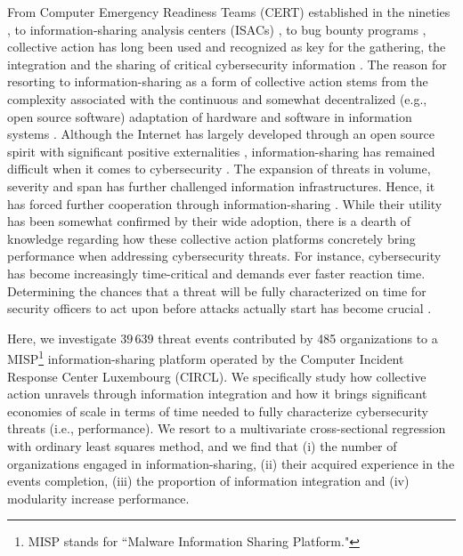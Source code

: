 \documentclass[unnumsec,webpdf,contemporary,large]{oup-authoring-template}%
\theoremstyle{thmstyleone}%
\theoremstyle{thmstyletwo}%
\theoremstyle{thmstylethree}%
\begin{document}
From Computer Emergency Readiness Teams (CERT) established in the nineties \cite{sridhar_cybersecurity_2021}, to information-sharing analysis centers (ISACs) \cite{gal-or_economic_2005}, to bug bounty programs \cite{maillart_given_2017, sridhar_hacking_2021}, collective action has long been used and recognized as key for the gathering, the integration and the sharing of critical cybersecurity information \cite{bohme_back_2016,laube_strategic_2017}. The reason for resorting to information-sharing as a form of collective action stems from the complexity associated with the continuous and somewhat decentralized (e.g., open source software) adaptation of hardware and software in information systems \cite{brady_murphys_1999, stojkovski_whats_2021}. Although the Internet has largely developed through an open source spirit \cite{levy_hackers_2010, benkler_penguin_2011, benkler_wealth_2006} with significant positive externalities \cite{katz_network_1985, shapiro_information_1999}, information-sharing has remained difficult when it comes to cybersecurity \cite{laube_strategic_2017}. The expansion of threats in volume, severity and span has further challenged information infrastructures. Hence, it has forced further cooperation through information-sharing  \cite{wagner_misp_2016}. While their utility has been somewhat confirmed by their wide adoption, there is a dearth of knowledge regarding how these collective action platforms concretely bring performance when addressing cybersecurity threats. For instance, cybersecurity has become increasingly time-critical and demands ever faster reaction time. Determining the chances that a threat will be fully characterized on time for security officers to act upon before attacks actually start has become crucial \cite{zibak_cyber_2019}.

Here, we investigate $39\,639$ threat events contributed by 485 organizations to a MISP\footnote{MISP stands for ``Malware Information Sharing Platform."}  information-sharing platform \cite{wagner_misp_2016} operated by the Computer Incident Response Center Luxembourg (CIRCL). We specifically study how collective action unravels through information integration and how it brings significant economies of scale in terms of time needed to fully characterize cybersecurity threats (i.e., performance). We resort to a multivariate cross-sectional regression with ordinary least squares method, and we find that (i) the number of organizations engaged in information-sharing, (ii) their acquired experience in the events completion, (iii) the proportion of information integration and (iv) modularity increase performance.
\end{document}
